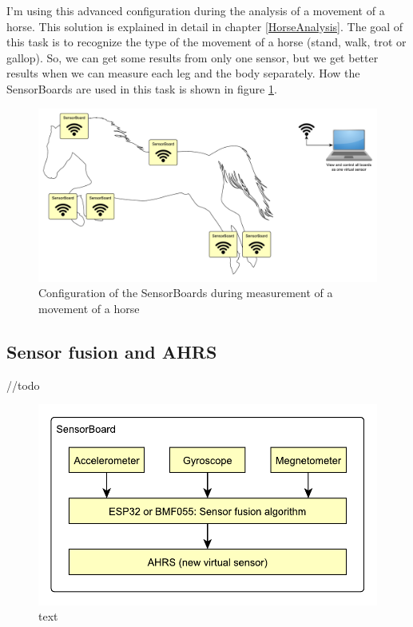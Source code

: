 I'm using this advanced configuration during the analysis of a movement of a horse. This solution is explained in detail in chapter \ref{HorseAnalysis}. The goal of this task is to recognize the type of the movement of a horse (stand, walk, trot or gallop). So, we can get some results from only one sensor, but we get better results when we can measure each leg and the body separately. How the SensorBoards are used in this task is shown in figure \ref{UELoggingHorse}.

\begin{figure}[H]
	\centering
	\label{UELoggingHorse}
	\caption{Configuration of the SensorBoards during measurement of a movement of a horse}
	\includegraphics[width=16cm]{img/UsageExamplesLoggerHorse.pdf}
\end{figure}

\subsection{Sensor fusion and AHRS}
//todo

\begin{figure}[H]
	\centering
	\label{UELogging1}
	\caption{text}
	\includegraphics[scale=1]{img/UsageExamplesAHRS.pdf}
\end{figure}

